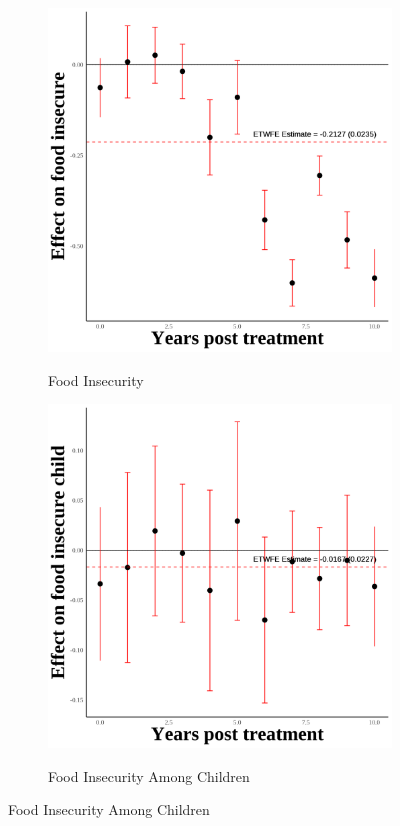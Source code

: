 \documentclass[12pt,english]{article}
\begin{document}
\begin{figure}[H]
  \begin{subfigure}[b]{0.3\textwidth}
    \centering
    \caption{Food Insecurity}
    \includegraphics[width=\linewidth]{figures/plot55-food_insecure_event_study-third.png}
    \label{fig:food-insecure-third}
  \end{subfigure}
  \hfill
  \begin{subfigure}[b]{0.3\textwidth}
    \centering
    \caption{Food Insecurity Among Children}
    \includegraphics[width=\linewidth]{figures/plot56-food_insecure_child_event_study-third.png}
    \label{fig:food-insecure-child-third}
  \end{subfigure}

\end{figure}
\end{document}
